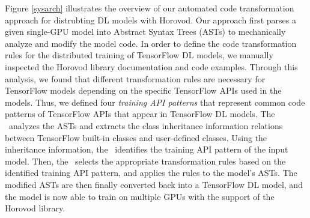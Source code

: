 Figure \ref{sysarch} illustrates the overview of our automated code
transformation approach for distrubting DL models with Horovod.
Our approach first parses a given single-GPU model into Abstract Syntax Trees
(ASTs) to mechanically analyze and modify the model code.
In order to define the code transformation rules for the distributed training
of TensorFlow DL models, we manually inspected the Horovod library
documentation and code examples. 
Through this analysis, we found that different transformation rules are
necessary for TensorFlow models depending on the specific TensorFlow APIs used
in the models.
Thus, we defined four \textit{training API patterns} that represent common code
patterns of TensorFlow APIs that appear in TensorFlow DL models.
The \cha~analyzes the ASTs and extracts the class
inheritance information relations between TensorFlow built-in classes and
user-defined classes.
Using the inheritance information, the \tapi~identifies the training API
pattern of the input model.  Then, the \atran~selects the appropriate
transformation rules based on the identified training API pattern, and applies
the rules to the model's ASTs. 
The modified ASTs are then finally converted back into a TensorFlow DL
model, and the model is now able to train on multiple GPUs with the support of
the Horovod library.






